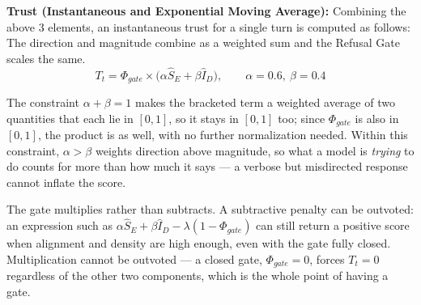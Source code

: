 \documentclass[conference]{IEEEtran}
\begin{document}
\textbf{Trust (Instantaneous and Exponential Moving Average):} 
Combining the above 3 elements, an instantaneous trust for a single turn is computed as follows:
The direction and magnitude combine as a weighted sum and the Refusal Gate scales the same. 
\begin{equation}
T_t = \Phi_{gate} \times \big(\alpha \hat{S}_E + \beta \hat{I}_D\big), \qquad \alpha = 0.6,\ \beta = 0.4
\label{eq:tt}
\end{equation}

The constraint $\alpha + \beta = 1$ makes the bracketed term a weighted average of two quantities that each lie in $[0,1]$, so it stays in $[0,1]$ too; since $\Phi_{gate}$ is also in $[0,1]$, the product is as well, with no further normalization needed. Within this constraint, $\alpha > \beta$ weights direction above magnitude, so what a model is \emph{trying} to do counts for more than how much it says — a verbose but misdirected response cannot inflate the score.

The gate multiplies rather than subtracts. A subtractive penalty can be outvoted: an expression such as $\alpha \hat{S}_E + \beta \hat{I}_D - \lambda(1 - \Phi_{gate})$ can still return a positive score when alignment and density are high enough, even with the gate fully closed. Multiplication cannot be outvoted — a closed gate, $\Phi_{gate}=0$, forces $T_t=0$ regardless of the other two components, which is the whole point of having a gate.
\end{document}
